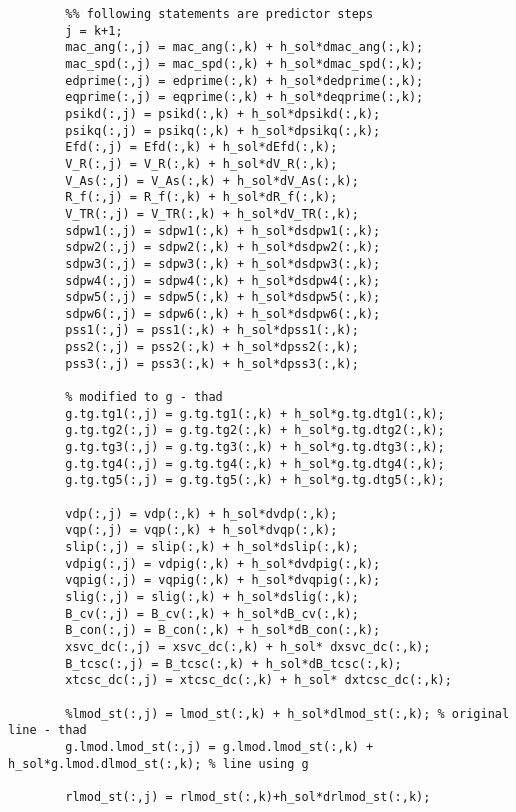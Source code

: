 \documentclass[12pt]{article}
\begin{document}
\begin{verbatim}
        %% following statements are predictor steps
        j = k+1;
        mac_ang(:,j) = mac_ang(:,k) + h_sol*dmac_ang(:,k);
        mac_spd(:,j) = mac_spd(:,k) + h_sol*dmac_spd(:,k);
        edprime(:,j) = edprime(:,k) + h_sol*dedprime(:,k);
        eqprime(:,j) = eqprime(:,k) + h_sol*deqprime(:,k);
        psikd(:,j) = psikd(:,k) + h_sol*dpsikd(:,k);
        psikq(:,j) = psikq(:,k) + h_sol*dpsikq(:,k);
        Efd(:,j) = Efd(:,k) + h_sol*dEfd(:,k);
        V_R(:,j) = V_R(:,k) + h_sol*dV_R(:,k);
        V_As(:,j) = V_As(:,k) + h_sol*dV_As(:,k);
        R_f(:,j) = R_f(:,k) + h_sol*dR_f(:,k);
        V_TR(:,j) = V_TR(:,k) + h_sol*dV_TR(:,k);
        sdpw1(:,j) = sdpw1(:,k) + h_sol*dsdpw1(:,k);
        sdpw2(:,j) = sdpw2(:,k) + h_sol*dsdpw2(:,k);
        sdpw3(:,j) = sdpw3(:,k) + h_sol*dsdpw3(:,k);
        sdpw4(:,j) = sdpw4(:,k) + h_sol*dsdpw4(:,k);
        sdpw5(:,j) = sdpw5(:,k) + h_sol*dsdpw5(:,k);
        sdpw6(:,j) = sdpw6(:,k) + h_sol*dsdpw6(:,k);
        pss1(:,j) = pss1(:,k) + h_sol*dpss1(:,k);
        pss2(:,j) = pss2(:,k) + h_sol*dpss2(:,k);
        pss3(:,j) = pss3(:,k) + h_sol*dpss3(:,k);
        
        % modified to g - thad
        g.tg.tg1(:,j) = g.tg.tg1(:,k) + h_sol*g.tg.dtg1(:,k);
        g.tg.tg2(:,j) = g.tg.tg2(:,k) + h_sol*g.tg.dtg2(:,k);
        g.tg.tg3(:,j) = g.tg.tg3(:,k) + h_sol*g.tg.dtg3(:,k);
        g.tg.tg4(:,j) = g.tg.tg4(:,k) + h_sol*g.tg.dtg4(:,k);
        g.tg.tg5(:,j) = g.tg.tg5(:,k) + h_sol*g.tg.dtg5(:,k);
        
        vdp(:,j) = vdp(:,k) + h_sol*dvdp(:,k);
        vqp(:,j) = vqp(:,k) + h_sol*dvqp(:,k);
        slip(:,j) = slip(:,k) + h_sol*dslip(:,k);
        vdpig(:,j) = vdpig(:,k) + h_sol*dvdpig(:,k);
        vqpig(:,j) = vqpig(:,k) + h_sol*dvqpig(:,k);
        slig(:,j) = slig(:,k) + h_sol*dslig(:,k);
        B_cv(:,j) = B_cv(:,k) + h_sol*dB_cv(:,k);
        B_con(:,j) = B_con(:,k) + h_sol*dB_con(:,k);
        xsvc_dc(:,j) = xsvc_dc(:,k) + h_sol* dxsvc_dc(:,k);
        B_tcsc(:,j) = B_tcsc(:,k) + h_sol*dB_tcsc(:,k);
        xtcsc_dc(:,j) = xtcsc_dc(:,k) + h_sol* dxtcsc_dc(:,k);
        
        %lmod_st(:,j) = lmod_st(:,k) + h_sol*dlmod_st(:,k); % original line - thad
        g.lmod.lmod_st(:,j) = g.lmod.lmod_st(:,k) + h_sol*g.lmod.dlmod_st(:,k); % line using g
        
        rlmod_st(:,j) = rlmod_st(:,k)+h_sol*drlmod_st(:,k);
        

\end{verbatim}
\end{document}
